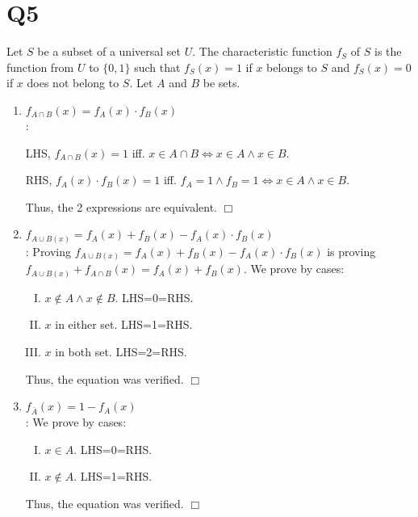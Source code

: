 \documentclass[11pt]{article}
\newenvironment{qparts}{\begin{enumerate}[{(}a{)}]}{\end{enumerate}}
\def\endproofmark{$\Box$}
\newenvironment{proof}{{\bf Proof}:}{\endproofmark\smallskip}
\begin{document}
\section*{Q5}
Let $S$ be a subset of a universal set $U$. The characteristic
function $f_S$ of $S$ is the function from $U$ to $\{0, 1\}$ such that
$f_S (x) = 1$ if $x$ belongs to $S $ and $f_S (x) = 0$ if $x$ does not belong
to $S$. Let $ A$ and $B$ be sets. 
\begin{qparts}    
    \item $f_{A \cap B}(x)=f_{A}(x)\cdot f_{B}(x)$\\
    \begin{proof}

        LHS, $f_{A\cap B}(x)=1$ iff. $x \in A \cap B \iff x \in A \land x \in B$.

        RHS, $f_{A}(x)\cdot f_{B}(x)=1$ iff. $ f_{A}=1 \land f_{B}=1
        \iff x \in A \land x \in B$.

        Thus, the 2 expressions are equivalent.
    \end{proof}

    
    \item $f_{A \cup B(x)}=f_{A}(x)+f_{B}(x)-f_{A}(x)\cdot f_{B}(x)$\\
    \begin{proof}
        Proving $f_{A \cup B(x)}=f_{A}(x)+f_{B}(x)-f_{A}(x)\cdot f_{B}(x)$ 
        is proving $f_{A \cup B(x)}+f_{A \cap B}(x)=f_{A}(x)+f_{B}(x)$.
        We prove by cases:
        \begin{enumerate}[I.]
            
            \item $x \notin A \land x \notin B$. LHS=0=RHS.
            \item $x$ in either set. LHS=1=RHS.
            \item $x$ in both set. LHS=2=RHS.
        \end{enumerate}
        Thus, the equation was verified.
    \end{proof}
    
    \item $f_{\overline{A}}(x)=1-f_{A}(x)$\\
    \begin{proof}
        We prove by cases:
        \begin{enumerate}[I.]
            
            \item $x \in A$. LHS=0=RHS.
            
            \item $x \notin A$. LHS=1=RHS.
        \end{enumerate}
        Thus, the equation was verified.
    \end{proof}
\end{qparts}
\end{document}
